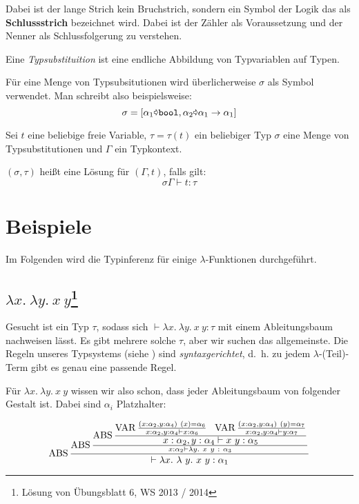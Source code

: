 Dabei ist der lange Strich kein Bruchstrich, sondern ein Symbol der Logik das als
\textbf{Schlussstrich} bezeichnet wird. Dabei ist der 
Zähler als Voraussetzung und der Nenner als Schlussfolgerung zu verstehen.

\begin{definition}[Typsubstituition]%
	Eine \textit{Typsubstituition} ist eine endliche Abbildung von Typvariablen auf
	Typen.
\end{definition}

Für eine Menge von Typsubsitutionen wird überlicherweise $\sigma$ als Symbol
verwendet. Man schreibt also beispielsweise:
\[\sigma = [\alpha_1 \text{\pointer} \text{\texttt{bool}}, \alpha_2 \text{\pointer} \alpha_1 \rightarrow \alpha_1]\]

\begin{definition}
	Sei $t$ eine beliebige freie Variable, $\tau = \tau(t)$ ein beliebiger Typ
	$\sigma$ eine Menge von Typsubstitutionen und $\Gamma$ ein Typkontext.

	$(\sigma, \tau)$ heißt eine Lösung für $(\Gamma, t)$, falls gilt:
	\[\sigma \Gamma \vdash t : \tau\]
\end{definition}

\section{Beispiele}
Im Folgenden wird die Typinferenz für einige $\lambda$-Funktionen durchgeführt.

\subsection[$\lambda x.\ \lambda y.\ x\ y$]{$\lambda x.\ \lambda y.\ x\ y$\footnote{Lösung von Übungsblatt 6, WS 2013 / 2014}}
Gesucht ist ein Typ $\tau$, sodass sich $\vdash \lambda x.\ \lambda y.\ x\ y: \tau$
mit einem Ableitungsbaum nachweisen lässt. Es gibt mehrere solche $\tau$, aber
wir suchen das allgemeinste. Die Regeln unseres Typsystems (siehe ) 
sind \textit{syntaxgerichtet}, d.~h. zu jedem $\lambda$-(Teil)-Term gibt es genau
eine passende Regel.

Für $\lambda x.\ \lambda y.\ x\ y$ wissen wir also schon, dass jeder Ableitungsbaum
von folgender Gestalt ist. Dabei sind $\alpha_i$ Platzhalter:

\[\ABS \frac{\ABS\frac{\textstyle\ABS \frac{\textstyle\VAR \frac{(x: \alpha_2, y: \alpha_4)\ (x) = \alpha_6}{x: \alpha_2, y: \alpha_4 \vdash x: \alpha_6}\ \ \VAR \frac{(x:\alpha_2, y: \alpha_4)\ (y) = \alpha_7}{x: \alpha_2, y: \alpha_4 \vdash y : \alpha_7}}{\textstyle x: \alpha_2, y: \alpha_4 \vdash x\ y: \alpha_5}}{x:\alpha_2 \vdash \lambda y.\ x\ y\ :\ \alpha_3}}{\vdash \lambda x.\ \lambda \ y.\ x\ y: \alpha_1}\]

